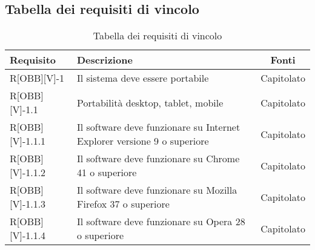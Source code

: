 \subsection{Tabella dei requisiti di vincolo}

\begin{center}
	\begin{table}[h]
	\begin{tabular}{|l|p{}|c|}
		\toprule
		
		\textbf{Requisito} & \textbf{Descrizione} & \textbf{Fonti} \\
		
		\midrule
		R[OBB][V]-1 & Il sistema deve essere portabile & Capitolato \\ \midrule
		R[OBB][V]-1.1 &	Portabilità desktop, tablet, mobile	& Capitolato\\  \midrule
		R[OBB][V]-1.1.1	& Il software deve funzionare su Internet Explorer versione 9 o superiore & Capitolato \\ \midrule
		R[OBB][V]-1.1.2	& Il software deve funzionare su Chrome 41 o superiore & Capitolato \\ \midrule
		R[OBB][V]-1.1.3 & Il software deve funzionare su Mozilla Firefox 37 o superiore & Capitolato  \\ \midrule
		R[OBB][V]-1.1.4	& Il software deve funzionare su Opera 28 o superiore & Capitolato \\

		\bottomrule
		
	\end{tabular}
	\caption{Tabella dei requisiti di vincolo}
	
	\end{table}
	
\end{center}

\newpage